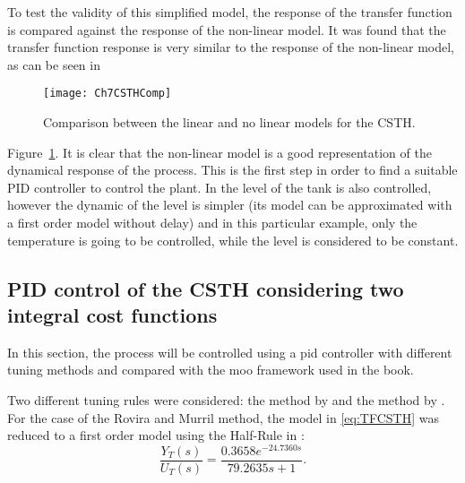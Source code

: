 To test the validity of this simplified model, the response of the transfer function is compared against the response of the non-linear model. It was found that the transfer function response is very similar to the response of the non-linear model, as can be seen in %
%
\begin{figure}[tb]
	\centering
	\texttt{[image: Ch7CSTHComp]}
	\caption{Comparison between the linear and no linear models for the CSTH.}
	\label{fig:Ch7CSTHComp}
\end{figure}
%
Figure~\ref{fig:Ch7CSTHComp}. It is clear that the non-linear model is a good representation of the dynamical response of the process. This is the first step in order to find a suitable PID controller to control the plant. In \citet{Alfaro2016} the level of the tank is also controlled, however the dynamic of the level is simpler (its model can be approximated with a first order model without delay) and in this particular example, only the temperature is going to be controlled, while the level is considered to be constant.
%
\subsection{PID control of the CSTH considering two integral cost functions}
\label{sec:PIDCSTH}
In this section, the process will be controlled using a \gls{pid} controller with different tuning methods and compared with the \gls{moo} framework used in the book.

Two different tuning rules were considered: the method by \citet{Rovira1969a} and the method by \citet{Murril1967}. For the case of the Rovira and Murril method, the model in \eqref{eq:TFCSTH} was reduced to a first order model using the Half-Rule in \citet{Skogestad2003}:
\begin{equation}
\frac{Y_T(s)}{U_T(s)} = \frac{0.3658 e^{-24.7360 s}}{79.2635 s +1}.
\label{eq:TFCSTHFirstOrder}
\end{equation}

